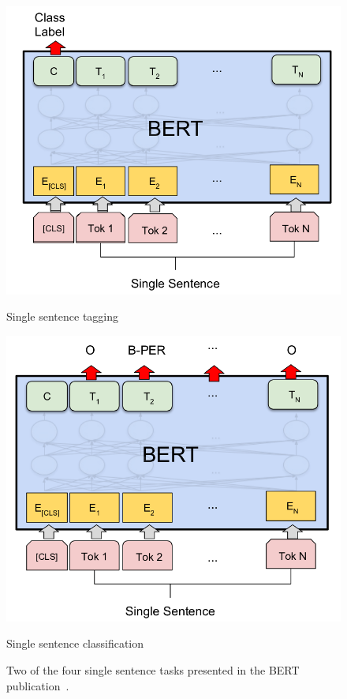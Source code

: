 \begin{figure}
    \centering
    \begin{minipage}{0.48\textwidth}
        \includegraphics[width=\textwidth]{figures/bert_single_sentence.png}
        \caption*{Single sentence tagging}
    \end{minipage}
    \hspace*{3mm}
    \begin{minipage}{0.48\textwidth}
        \includegraphics[width=\textwidth]{figures/bert_ner.png}
        \caption*{Single sentence classification}
    \end{minipage}
    \caption{Two of the four single sentence tasks presented in the BERT publication~\cite[Figure 3]{devlin2018}.}
    \label{fig:bert_classification}
\end{figure}

